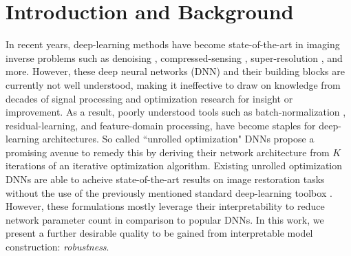 \documentclass[conference]{IEEEtran}
\newcommand{\soa}{state-of-the-art }
\begin{document}
\section{Introduction and Background}
In recent years, deep-learning methods have become \soa in imaging inverse
problems such as denoising \cite{DnCNN,FFDNet}, compressed-sensing \cite{Lecouat2020Games},
super-resolution \cite{DnCNN}, and more. However, these deep neural
networks (DNN) and their building blocks are currently not well understood, making it ineffective to draw on knowledge from
decades of signal processing and optimization research for insight or
improvement. As a result, poorly understood tools such as
batch-normalization \cite{Ioffe2015}, residual-learning, and feature-domain processing, have become staples for deep-learning
architectures. So called ``unrolled optimization" DNNs \cite{unrolling} propose a promising avenue to remedy this by deriving their network architecture from $K$ iterations of an iterative optimization algorithm. Existing unrolled optimization DNNs are able to acheive \soa results on image restoration tasks without the use of the previously mentioned standard deep-learning toolbox  \cite{Simon2019, Lecouat2020Games}. However, these formulations mostly leverage their interpretability to reduce network parameter count in comparison to popular DNNs. In this work, we present a further desirable quality to be gained from interpretable model construction: \textit{robustness}. 
\end{document}
